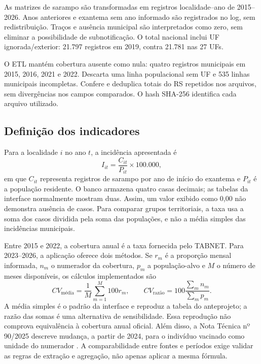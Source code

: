 \documentclass[12pt]{article}
\begin{document}
As matrizes de sarampo são transformadas em registros localidade--ano de 2015--2026. Anos anteriores e exantema sem ano informado são registrados no log, sem redistribuição. Traços e ausência municipal são interpretados como zero, sem eliminar a possibilidade de subnotificação. O total nacional inclui UF ignorada/exterior: 21.797 registros em 2019, contra 21.781 nas 27 UFs.

O ETL mantém cobertura ausente como nula: quatro registros municipais em 2015, 2016, 2021 e 2022. Descarta uma linha populacional sem UF e 535 linhas municipais incompletas. Confere e deduplica totais do RS repetidos nos arquivos, sem divergências nos campos comparados. O hash SHA-256 identifica cada arquivo utilizado.

\subsection{Definição dos indicadores}
Para a localidade $i$ no ano $t$, a incidência apresentada é
\begin{equation}
 I_{it}=\frac{C_{it}}{P_{it}}\times 100.000,
\end{equation}
em que $C_{it}$ representa registros de sarampo por ano de início do exantema e $P_{it}$ é a população residente. O banco armazena quatro casas decimais; as tabelas da interface normalmente mostram duas. Assim, um valor exibido como 0,00 não demonstra ausência de casos. Para comparar grupos territoriais, a taxa usa a soma dos casos dividida pela soma das populações, e não a média simples das incidências municipais.

Entre 2015 e 2022, a cobertura anual é a taxa fornecida pelo TABNET. Para 2023--2026, a aplicação oferece dois métodos. Se $r_m$ é a proporção mensal informada, $n_m$ o numerador da cobertura, $p_m$ a população-alvo e $M$ o número de meses disponíveis, os cálculos implementados são
\begin{equation}
 CV_{\text{média}}=\frac{1}{M}\sum_{m=1}^{M}100r_m,
 \qquad
 CV_{\text{razão}}=100\frac{\sum_m n_m}{\sum_m p_m}.
\end{equation}
A média simples é o padrão da interface e reproduz a tabela do anteprojeto; a razão das somas é uma alternativa de sensibilidade. Essa reprodução não comprova equivalência à cobertura anual oficial. Além disso, a Nota Técnica nº 90/2025 descreve mudança, a partir de 2024, para o indivíduo vacinado como unidade do numerador \cite{nota90}. A comparabilidade entre fontes e períodos exige validar as regras de extração e agregação, não apenas aplicar a mesma fórmula.
\end{document}
